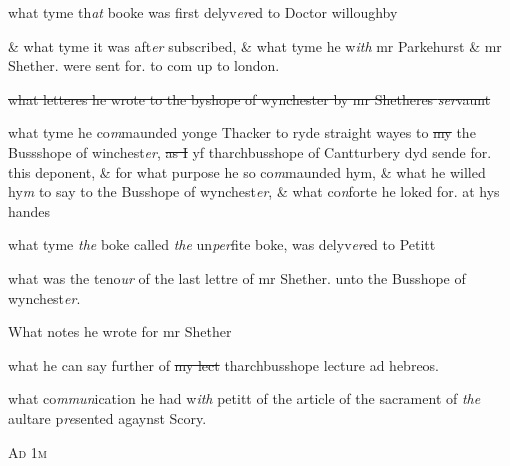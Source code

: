 \documentclass[12pt, a4paper]{book}
\begin{document}
		\ifthenelse{\isodd{\thepage}}
		{\reversemarginpar}
		{\normalmarginpar}
		what tyme th\textit{at} booke was first 
			delyv\textit{er}ed to Doctor willoughby

		\ifthenelse{\isodd{\thepage}}
		{\reversemarginpar}
		{\normalmarginpar}
		\& what tyme it was aft\textit{er} subscribed, \& what tyme he
w\textit{ith }mr Parkehurst \& mr Shether. were sent for. to
com up to london.
            		
		\ifthenelse{\isodd{\thepage}}
		{\reversemarginpar}
		{\normalmarginpar}
		\sout{what letteres he wrote to the byshope of wynchester
by mr Shetheres \textit{ser}vaunt}
            		
		\ifthenelse{\isodd{\thepage}}
		{\reversemarginpar}
		{\normalmarginpar}
		what tyme he co\textit{m}maunded yonge Thacker to ryde
            			straight wayes to \sout{my} the Bussshope of winchest\textit{er},
            		\sout{as I} yf tharchbusshope of Cantturbery dyd sende for.
this deponent, \& for what purpose he so co\textit{m}maunded hym,
            			\& what he willed hy\textit{m} to say to the Busshope of 
            				wynchest\textit{er}, \& what co\textit{n}forte he loked for. at hys handes
            		
		\ifthenelse{\isodd{\thepage}}
		{\reversemarginpar}
		{\normalmarginpar}
		what tyme \textit{the} boke called \textit{the} un\textit{per}fite boke, was
delyv\textit{er}ed to Petitt
            		
		\ifthenelse{\isodd{\thepage}}
		{\reversemarginpar}
		{\normalmarginpar}
		what was the teno\textit{ur} of the last lettre of mr Shether.
            			unto the Busshope of wynchest\textit{er}.

		\ifthenelse{\isodd{\thepage}}
		{\reversemarginpar}
		{\normalmarginpar}
		What notes he wrote for mr Shether
		
            		
		\ifthenelse{\isodd{\thepage}}
		{\reversemarginpar}
		{\normalmarginpar}
		what he can say further of \sout{my lect} tharchbusshope
lecture ad hebreos.
            		
		\ifthenelse{\isodd{\thepage}}
		{\reversemarginpar}
		{\normalmarginpar}
		what co\textit{mmun}ication he had w\textit{ith} petitt of the article of the
sacrament of \textit{the} aultare p\textit{re}sented agaynst Scory.

				\begin{center} \begin{large} {\scshape Ad 1m} \end{large} \end{center}
			
\end{document}
